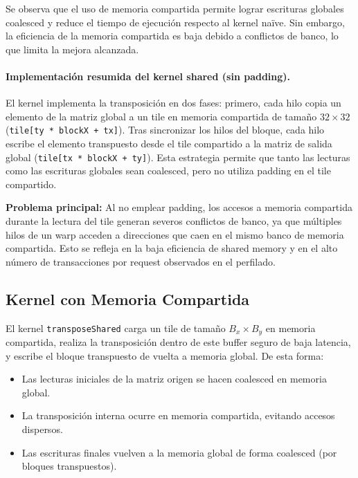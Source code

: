 \documentclass[a4paper,11pt]{article}
\begin{document}
Se observa que el uso de memoria compartida permite lograr escrituras globales coalesced y reduce el tiempo de ejecución respecto al kernel naïve. Sin embargo, la eficiencia de la memoria compartida es baja debido a conflictos de banco, lo que limita la mejora alcanzada.

\paragraph{Implementación resumida del kernel shared (sin padding).}
El kernel implementa la transposición en dos fases: primero, cada hilo copia un elemento de la matriz global a un tile en memoria compartida de tamaño $32\times32$ (\texttt{tile[ty * blockX + tx]}). Tras sincronizar los hilos del bloque, cada hilo escribe el elemento transpuesto desde el tile compartido a la matriz de salida global (\texttt{tile[tx * blockX + ty]}). Esta estrategia permite que tanto las lecturas como las escrituras globales sean coalesced, pero no utiliza padding en el tile compartido.

\textbf{Problema principal:} Al no emplear padding, los accesos a memoria compartida durante la lectura del tile generan severos conflictos de banco, ya que múltiples hilos de un warp acceden a direcciones que caen en el mismo banco de memoria compartida. Esto se refleja en la baja eficiencia de shared memory y en el alto número de transacciones por request observados en el perfilado.

\subsection{Kernel con Memoria Compartida}
El kernel \texttt{transposeShared} carga un tile de tamaño $B_x\times B_y$ en memoria compartida, realiza la transposición dentro de este buffer 
seguro de baja latencia, y escribe el bloque transpuesto de vuelta a memoria global. De esta forma:
\begin{itemize}[noitemsep]
  \item Las lecturas iniciales de la matriz origen se hacen coalesced en memoria global.
  \item La transposición interna ocurre en memoria compartida, evitando accesos dispersos.
  \item Las escrituras finales vuelven a la memoria global de forma coalesced (por bloques transpuestos).
\end{itemize}
\end{document}

